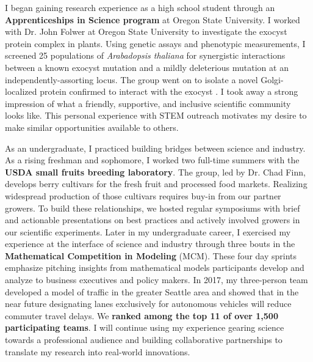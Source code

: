 \noindent
\underline{}
I began gaining research experience as a high school student through an \textbf{Apprenticeships in Science program} at Oregon State University.
I worked with Dr. John Folwer at Oregon State University to investigate the exocyst protein complex in plants.
Using genetic assays and phenotypic measurements, I screened 25 populations of \textit{Arabadopsis thaliana} for synergistic interactions between a known exocyst mutation and a mildly deleterious mutation at an independently-assorting locus.
The group went on to isolate a novel Golgi-localized protein confirmed to interact with the exocyst \cite{fowler}.
I took away a strong impression of what a friendly, supportive, and inclusive scientific community looks like.
This personal experience with STEM outreach motivates my desire to make similar opportunities available to others.

As an undergraduate, I practiced building bridges between science and industry.
As a rising freshman and sophomore, I worked two full-time summers with the \textbf{USDA small fruits breeding laboratory}.
The group, led by Dr. Chad Finn, develops berry cultivars for the fresh fruit and processed food markets.
Realizing widespread production of those cultivars requires buy-in from our partner growers.
To build these relationships, we hosted regular symposiums with brief and actionable presentations on best practices and actively involved growers in our scientific experiments.
Later in my undergraduate career, I exercised my experience at the interface of science and industry through three bouts in the \textbf{Mathematical Competition in Modeling} (MCM).
These four day sprints emphasize pitching insights from mathematical models participants develop and analyze to business executives and policy makers.
In 2017, my three-person team developed a model of traffic in the greater Seattle area and showed that in the near future designating lanes exclusively for autonomous vehicles will reduce commuter travel delays.
We \textbf{ranked among the top 11 of over 1,500 participating teams}.
I will continue using my experience gearing science towards a professional audience and building collaborative partnerships to translate my research into real-world innovations.

